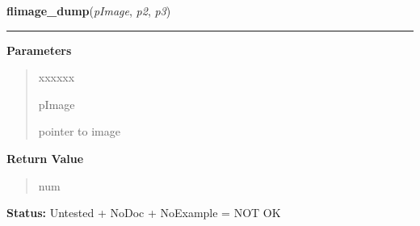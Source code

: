 \hspace{.8\funcindent}\begin{boxedminipage}{\funcwidth}

    \raggedright \textbf{flimage\_dump}(\textit{pImage}, \textit{p2}, \textit{p3})

    \vspace{-1.5ex}

    \rule{\textwidth}{0.5\fboxrule}
\setlength{\parskip}{2ex}
\setlength{\parskip}{1ex}
      \textbf{Parameters}
      \vspace{-1ex}

      \begin{quote}
        \begin{Ventry}{xxxxxx}

          \item[pImage]

          pointer to image

        \end{Ventry}

      \end{quote}

      \textbf{Return Value}
    \vspace{-1ex}

      \begin{quote}
      num

      \end{quote}

\textbf{Status:} Untested + NoDoc + NoExample = NOT OK



    \end{boxedminipage}

    \label{xformslib:library:flimage_close}

    \vspace{0.5ex}

